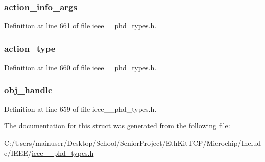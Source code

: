 \subsubsection[{action\+\_\+info\+\_\+args}]{ action\+\_\+info\+\_\+args}\label{struct___action_result_simple_aa60d83842c341dc10b70484bfb38634c}


Definition at line 661 of file ieee\+\_\+\_\+phd\+\_\+types.\+h.

\hypertarget{struct___action_result_simple_aa7cb846e240dc56bd1c2fcc0ee736fd5}{}
\subsubsection[{action\+\_\+type}]{ action\+\_\+type}\label{struct___action_result_simple_aa7cb846e240dc56bd1c2fcc0ee736fd5}


Definition at line 660 of file ieee\+\_\+\_\+phd\+\_\+types.\+h.

\hypertarget{struct___action_result_simple_abbfff52b7a4956021522f5750c4b32c6}{}
\subsubsection[{obj\+\_\+handle}]{ obj\+\_\+handle}\label{struct___action_result_simple_abbfff52b7a4956021522f5750c4b32c6}


Definition at line 659 of file ieee\+\_\+\_\+phd\+\_\+types.\+h.



The documentation for this struct was generated from the following file\+:\begin{DoxyCompactItemize}
\item 
C\+:/\+Users/mainuser/\+Desktop/\+School/\+Senior\+Project/\+Eth\+Kit\+T\+C\+P/\+Microchip/\+Include/\+I\+E\+E\+E/\hyperlink{ieee__11073__phd__types_8h}{ieee\+\_\+\_\+phd\+\_\+types.\+h}\end{DoxyCompactItemize}
